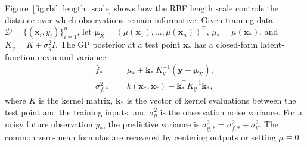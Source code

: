 \documentclass[11pt,a4paper]{report}
\newcommand{\x}{\bm{x}}
\begin{document}
Figure~\ref{fig:rbf_length_scale} shows how the RBF length scale controls the distance over which observations remain informative.  Given training data $\mathcal{D} = \{(\x_i, y_i)\}_{i=1}^n$, let $\bm{\mu}_X = (\mu(\x_1),\ldots,\mu(\x_n))^\top$, $\mu_*=\mu(\x_*)$, and $K_y = K + \sigma_y^2 I$.  The GP posterior at a test point $\x_*$ has a closed-form latent-function mean and variance:
\begin{align}
\bar{f}_* &= \mu_* + \bm{k}_*^\top K_y^{-1}(\bm{y}-\bm{\mu}_X), \label{eq:gp_mean}\\
\sigma_{f,*}^2 &= k(\x_*, \x_*) - \bm{k}_*^\top K_y^{-1} \bm{k}_*, \label{eq:gp_var}
\end{align}
where $K$ is the kernel matrix, $\bm{k}_*$ is the vector of kernel evaluations between the test point and the training inputs, and $\sigma_y^2$ is the observation noise variance.  For a noisy future observation $y_*$, the predictive variance is $\sigma_{y,*}^2 = \sigma_{f,*}^2 + \sigma_y^2$.  The common zero-mean formulas are recovered by centering outputs or setting $\mu \equiv 0$.
\end{document}
